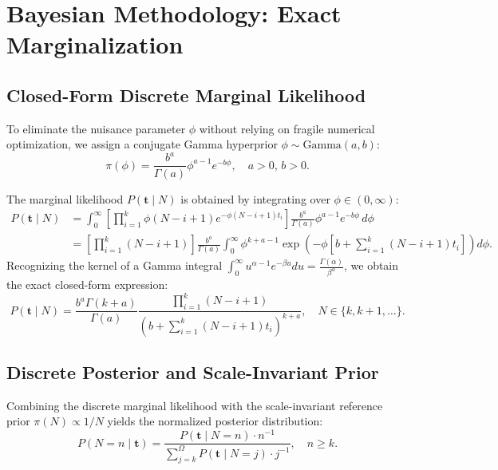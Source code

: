 \documentclass[11pt,a4paper]{article}
\begin{document}
\section{Bayesian Methodology: Exact Marginalization}

\subsection{Closed-Form Discrete Marginal Likelihood}
To eliminate the nuisance parameter $\phi$ without relying on fragile numerical optimization, we assign a conjugate Gamma hyperprior $\phi \sim \text{Gamma}(a, b)$:
\begin{equation}
\pi(\phi) = \frac{b^a}{\Gamma(a)} \phi^{a-1} e^{-b \phi}, \quad a > 0, \, b > 0.
\end{equation}

The marginal likelihood $P(\mathbf{t} \mid N)$ is obtained by integrating over $\phi \in (0, \infty)$:
\begin{align}
P(\mathbf{t} \mid N) &= \int_0^\infty \left[ \prod_{i=1}^k \phi (N - i + 1) e^{-\phi (N - i + 1) t_i} \right] \frac{b^a}{\Gamma(a)} \phi^{a-1} e^{-b\phi} \, d\phi \\
&= \left[ \prod_{i=1}^k (N - i + 1) \right] \frac{b^a}{\Gamma(a)} \int_0^\infty \phi^{k + a - 1} \exp\left( -\phi \left[ b + \sum_{i=1}^k (N - i + 1) t_i \right] \right) d\phi.
\end{align}
Recognizing the kernel of a Gamma integral $\int_0^\infty u^{\alpha-1} e^{-\beta u} du = \frac{\Gamma(\alpha)}{\beta^\alpha}$, we obtain the exact closed-form expression:
\begin{equation}
\label{eq:jm_marginal}
P(\mathbf{t} \mid N) = \frac{b^a \Gamma(k + a)}{\Gamma(a)} \frac{\prod_{i=1}^k (N - i + 1)}{\left( b + \sum_{i=1}^k (N - i + 1) t_i \right)^{k + a}}, \quad N \in \{k, k+1, \dots\}.
\end{equation}

\subsection{Discrete Posterior and Scale-Invariant Prior}
Combining the discrete marginal likelihood with the scale-invariant reference prior $\pi(N) \propto 1/N$ yields the normalized posterior distribution:
\begin{equation}
P(N = n \mid \mathbf{t}) = \frac{P(\mathbf{t} \mid N=n) \cdot n^{-1}}{\sum_{j=k}^\Omega P(\mathbf{t} \mid N=j) \cdot j^{-1}}, \quad n \ge k.
\end{equation}
\end{document}
